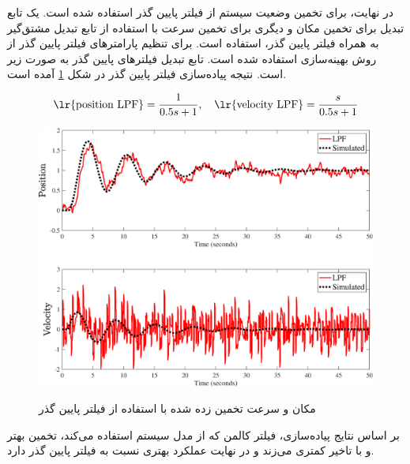 در نهایت، برای تخمین وضعیت سیستم از فیلتر پایین گذر استفاده شده است.
یک تابع تبدیل برای تخمین مکان و دیگری برای تخمین سرعت با استفاده از  تابع تبدیل مشتق‌گیر به همراه فیلتر پایین گذر، استفاده است.
برای تنظیم پارامترهای فیلتر پایین گذر از روش بهینه‌سازی
استفاده شده است.
تابع تبدیل فیلترهای پایین گذر به صورت زیر است.
نتیجه پیاده‌سازی فیلتر پایین گذر در شکل 
\ref{fig:lpf}
آمده است.

\begin{equation}
	\text{\lr{position LPF}} = \dfrac{1}{0.5s+1}, \quad \text{\lr{velocity LPF}} = \dfrac{s}{0.5s+1}
\end{equation}
 \begin{figure}[H]
	\centering
	\includegraphics[width=\linewidth]{../Figure/Q4/LPF}
	\label{fig:lpf}
	\caption{مکان و سرعت تخمین زده شده با استفاده از فیلتر پایین گذر}
\end{figure}

بر اساس نتایج پیاده‌سازی، فیلتر کالمن که از مدل سیستم استفاده می‌کند، تخمین بهتر و با تاخیر کمتری می‌زند و در نهایت عملکرد بهتری نسبت به فیلتر پایین گذر دارد.

